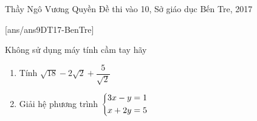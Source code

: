 
\begin{name}
{Thầy  Ngô Vương Quyền}
{Đề thi vào 10, Sở giáo dục Bến Tre, 2017}
\end{name}
\setcounter{ex}{0}
[ans/ans9DT17-BenTre]
\begin{ex}%
Không sử dụng máy tính cầm tay hãy 
\begin{enumerate}
\item Tính $\sqrt{18}-2\sqrt{2}+\dfrac{5}{\sqrt{2}}$
\item Giải hệ phương trình $\left\{\begin{aligned}& 3x-y=1\\ & x+2y=5\end{aligned}\right.$
\end{enumerate}
\end{ex}

